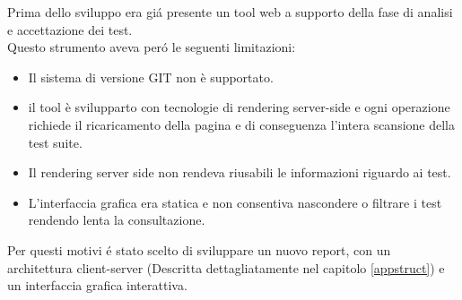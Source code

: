         Prima dello sviluppo era gi\'a presente un tool web a supporto della fase di analisi e accettazione dei test.\\
        Questo strumento aveva per\'o le seguenti limitazioni:\\
        \begin{itemize}
            \item Il sistema di versione GIT non è supportato.
            \item il tool è svilupparto con tecnologie di rendering server-side e ogni operazione richiede il ricaricamento della pagina e di conseguenza l'intera scansione della test suite.
            \item Il rendering server side non rendeva riusabili le informazioni riguardo ai test.
            \item L'interfaccia grafica era statica e non consentiva nascondere o filtrare i test rendendo lenta la consultazione.
        \end{itemize}

        Per questi motivi \'e stato scelto di sviluppare un nuovo report, con un architettura client-server (Descritta dettagliatamente nel capitolo \ref{appstruct}) e un interfaccia grafica interattiva.